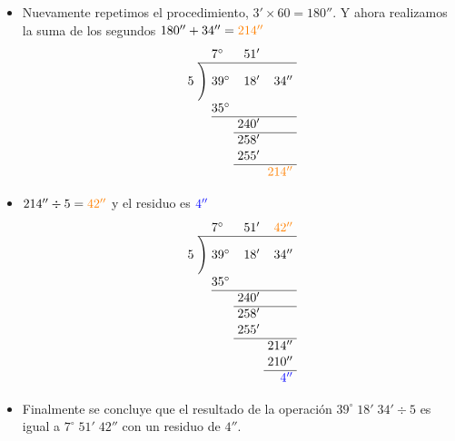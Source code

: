 \begin{example}
\begin{itemize}
		\item Nuevamente repetimos el procedimiento, $3' \times 60 = 180''$. 
		Y ahora realizamos la suma de los segundos $180'' + 34'' = 
		\textcolor{orange}{214''}$
		\begin{align*}
			\renewcommand\arraystretch{1.05}\renewcommand\arraycolsep{3pt}
			\begin{array}{r@{\hskip\arraycolsep}c@{\hskip\arraycolsep}l*2r} %
				 &&7^\circ & 51' & \\
				\cline{2-5} %
			5&\Bigg)&39^\circ&18'&34''\\
			&& 35^\circ & & \\
			\cline{3-5} %
			&&  & 240'  & \\
			\cline{4-5} %
			&&  & 258'  & \\
			&&  & 255'  & \\
			\cline{4-5} %
			&&  &  & \textcolor{orange}{214''}
			\end{array}
		\end{align*}	
	
		\item $214'' \div 5 = \textcolor{orange}{42''} $ y el residuo es 
		$\textcolor{blue}{4''}$
		\begin{align*}
			\renewcommand\arraystretch{1.05}\renewcommand\arraycolsep{3pt}
			\begin{array}{r@{\hskip\arraycolsep}c@{\hskip\arraycolsep}l*2r} %
				 &&7^\circ & 51' & \textcolor{orange}{42''} \\
				\cline{2-5} %
			5&\Bigg)&39^\circ&18'&34''\\
			&& 35^\circ & & \\
			\cline{3-5} %
			&&  & 240'  & \\
			\cline{4-5} %
			&&  & 258'  & \\
			&&  & 255'  & \\
			\cline{4-5} %
			&&  &  & 214'' \\
			&&  &  & 210'' \\
			\cline{5-5} %
			&&  &  & \textcolor{blue}{4''} \\
			\end{array}
		\end{align*}	

		\item Finalmente se concluye que el resultado de la operación 
		$39^\circ\; 18'\; 34' \div 5$ es igual a $7^\circ\; 51'\; 42''$ con un 
		residuo de $4''$.

	\end{itemize}

\end{example}

